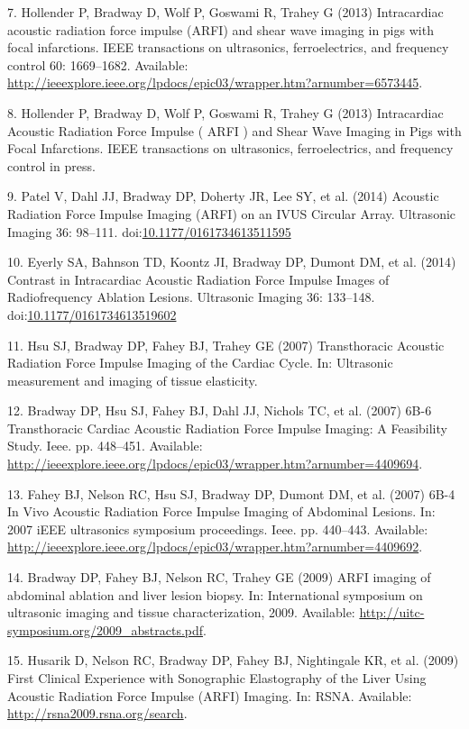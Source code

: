 \documentclass[]{article}
\begin{document}
7. Hollender P, Bradway D, Wolf P, Goswami R, Trahey G (2013)
Intracardiac acoustic radiation force impulse (ARFI) and shear wave
imaging in pigs with focal infarctions. IEEE transactions on
ultrasonics, ferroelectrics, and frequency control 60: 1669--1682.
Available:
\url{http://ieeexplore.ieee.org/lpdocs/epic03/wrapper.htm?arnumber=6573445}.

8. Hollender P, Bradway D, Wolf P, Goswami R, Trahey G (2013)
Intracardiac Acoustic Radiation Force Impulse ( ARFI ) and Shear Wave
Imaging in Pigs with Focal Infarctions. IEEE transactions on
ultrasonics, ferroelectrics, and frequency control in press.

9. Patel V, Dahl JJ, Bradway DP, Doherty JR, Lee SY, et al. (2014)
Acoustic Radiation Force Impulse Imaging (ARFI) on an IVUS Circular
Array. Ultrasonic Imaging 36: 98--111.
doi:\href{http://dx.doi.org/10.1177/0161734613511595}{10.1177/0161734613511595}

10. Eyerly SA, Bahnson TD, Koontz JI, Bradway DP, Dumont DM, et al.
(2014) Contrast in Intracardiac Acoustic Radiation Force Impulse Images
of Radiofrequency Ablation Lesions. Ultrasonic Imaging 36: 133--148.
doi:\href{http://dx.doi.org/10.1177/0161734613519602}{10.1177/0161734613519602}

11. Hsu SJ, Bradway DP, Fahey BJ, Trahey GE (2007) Transthoracic
Acoustic Radiation Force Impulse Imaging of the Cardiac Cycle. In:
Ultrasonic measurement and imaging of tissue elasticity.

12. Bradway DP, Hsu SJ, Fahey BJ, Dahl JJ, Nichols TC, et al. (2007)
6B-6 Transthoracic Cardiac Acoustic Radiation Force Impulse Imaging: A
Feasibility Study. Ieee. pp. 448--451. Available:
\url{http://ieeexplore.ieee.org/lpdocs/epic03/wrapper.htm?arnumber=4409694}.

13. Fahey BJ, Nelson RC, Hsu SJ, Bradway DP, Dumont DM, et al. (2007)
6B-4 In Vivo Acoustic Radiation Force Impulse Imaging of Abdominal
Lesions. In: 2007 iEEE ultrasonics symposium proceedings. Ieee. pp.
440--443. Available:
\url{http://ieeexplore.ieee.org/lpdocs/epic03/wrapper.htm?arnumber=4409692}.

14. Bradway DP, Fahey BJ, Nelson RC, Trahey GE (2009) ARFI imaging of
abdominal ablation and liver lesion biopsy. In: International symposium
on ultrasonic imaging and tissue characterization, 2009. Available:
\url{http://uitc-symposium.org/2009_abstracts.pdf}.

15. Husarik D, Nelson RC, Bradway DP, Fahey BJ, Nightingale KR, et al.
(2009) First Clinical Experience with Sonographic Elastography of the
Liver Using Acoustic Radiation Force Impulse (ARFI) Imaging. In: RSNA.
Available: \url{http://rsna2009.rsna.org/search}.
\end{document}
